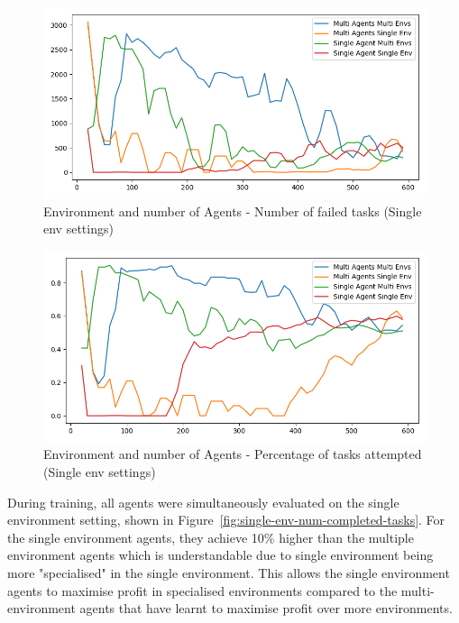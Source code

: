 \begin{figure}[H]
    \centering
    \includegraphics[width=\linewidth]{figures/5_evaluation_figs/env_agent_num_training_fig/single_env_num_failed_tasks.png}
    \caption{Environment and number of Agents - Number of failed tasks (Single env settings)}
    \label{fig:single-env-num-failed-tasks}
\end{figure}

\begin{figure}[H]
    \centering
    \includegraphics[width=\linewidth]{figures/5_evaluation_figs/env_agent_num_training_fig/single_env_percent_tasks.png}
    \caption{Environment and number of Agents - Percentage of tasks attempted (Single env settings)}
    \label{fig:single-env-percent-tasks}
\end{figure}

During training, all agents were simultaneously evaluated on the single environment setting, shown in
Figure~\ref{fig:single-env-num-completed-tasks}. For the single environment agents, they achieve 10\% higher than the
multiple environment agents which is understandable due to single environment being more "specialised" in the single
environment. This allows the single environment agents to maximise profit in specialised environments compared to the
multi-environment agents that have learnt to maximise profit over more environments.

